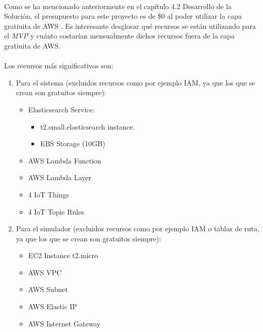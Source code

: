 \documentclass[../../memoria.tex]{subfiles}
\begin{document}
\paragraph{}
Como se ha mencionado anteriormente en el capítulo 4.2 Desarrollo de la Solución, el presupuesto para este proyecto es de \$0 al poder utilizar la capa gratiuita de AWS \cite{awsfreetier}. Es interesante desglosar qué recursos se están utilizando para el \textit{MVP} y cuánto costarían mensualmente dichos recursos fuera de la capa gratiuita de AWS.

\paragraph{}
Los recursos más significativos son:

\begin{enumerate}

    \item Para el sistema (excluidos recursos como por ejemplo IAM, ya que los que se crean son gratuitos siempre):

          \begin{itemize}
              \item Elasticsearch Service:
                    \begin{itemize}
                        \item t2.small.elasticsearch instance.
                        \item EBS Storage (10GB)
                    \end{itemize}

              \item AWS Lambda Function
              \item AWS Lambda Layer
              \item 4 IoT Things
              \item 4 IoT Topic Rules
          \end{itemize}

    \item Para el simulador (excluidos recursos como por ejemplo IAM o tablas de ruta, ya que los que se crean son gratuitos siempre):
          \begin{itemize}
              \item EC2 Instance t2.micro
              \item AWS VPC
              \item AWS Subnet
              \item AWS Elastic IP
              \item AWS Internet Gateway
          \end{itemize}
\end{enumerate}
\end{document}
